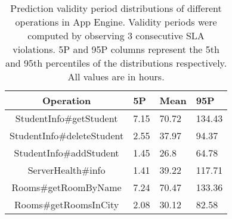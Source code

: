 
\begin{table}[htdp]
\caption{Prediction validity period distributions of different operations in App Engine. Validity periods were computed by observing 3 consecutive SLA violations. 5P and 95P columns represent the 5th and 95th percentiles of the
distributions respectively. All values are in hours.}
\begin{center}
\begin{tabular}{|c|p{1cm}|p{1cm}|p{1cm}|}
\hline
Operation & 5P & Mean & 95P \\ \hline
StudentInfo\#getStudent & 7.15 & 70.72 & 134.43 \\ \hline
StudentInfo\#deleteStudent & 2.55 & 37.97 & 94.37 \\ \hline
StudentInfo\#addStudent & 1.45 & 26.8 & 64.78 \\ \hline
ServerHealth\#info & 1.41 & 39.22 & 117.71 \\ \hline
Rooms\#getRoomByName & 7.24 & 70.47 & 133.36 \\ \hline
Rooms\#getRoomsInCity & 2.08 & 30.12 & 82.58 \\ \hline
\end{tabular}
\end{center}
\label{tab:gae_validity}
\end{table}


